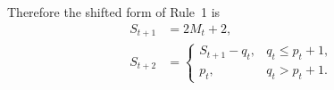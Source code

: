 Therefore the shifted form of Rule~1 is
\begin{equation}
\boxed{
\begin{aligned}
S_{t+1}&=2M_t+2,\\[1mm]
S_{t+2}
&=
\begin{cases}
S_{t+1}-q_t,
& q_t\leq p_t+1,
\\[2mm]
p_t,
& q_t>p_t+1.
\end{cases}
\end{aligned}}
\end{equation}



